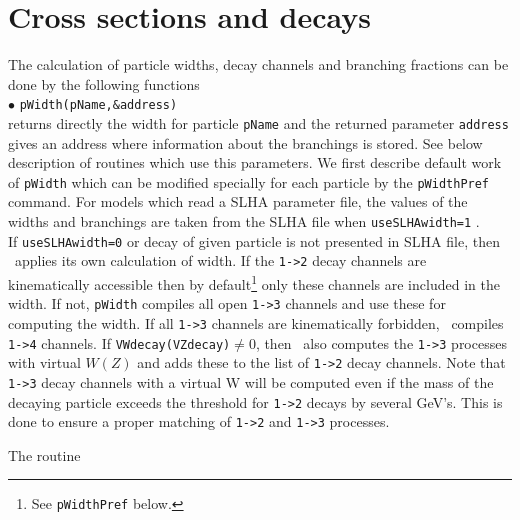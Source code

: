 \documentclass[12pt,a4paper]{article}
\begin{document}
\section{Cross sections and decays}
\label{cross_section}

The calculation of particle widths, decay channels  and branching fractions
can be done by the following functions\\[2mm]
%
\noindent
$\bullet$ \verb|pWidth(pName,&address)|\\
returns directly the width for  particle {\tt pName} and the returned  parameter \verb|address| 
gives  an address where information about the branchings is stored. See below description of routines which use this parameters. 
We first describe default work of {\tt pWidth} which can be modified specially for each particle by the {\tt pWidthPref} command.
For models which read a SLHA parameter file, the values of the widths and branchings are taken from the SLHA
file when \verb|useSLHAwidth=1| .\\[2mm] If \verb|useSLHAwidth=0| or decay of given particle is not presented in SLHA file, then \micro\ applies its own 
calculation of width.   If the  \verb|1->2| 
decay channels are kinematically accessible 
then by default\footnote{See {\tt pWidthPref} below.  }   only these channels are
included in the width. If not, {\tt pWidth} compiles all open \verb|1->3| channels and use these for  computing the width.
If all \verb|1->3| channels are kinematically forbidden, \micro\ compiles \verb|1->4| channels.
If \verb|VWdecay(VZdecay)|$\ne 0$, then \micro\  also computes   the \verb|1->3|   processes with virtual $W(Z)$  and adds these to the list of \verb|1->2| decay channels.
 Note that \verb|1->3| decay channels with a virtual W  will be computed even
if the mass of the decaying particle exceeds the threshold for \verb|1->2| decays by several GeV's. This is done to ensure a 
proper matching of \verb|1->2| and \verb|1->3| processes.


The routine 
\end{document}
